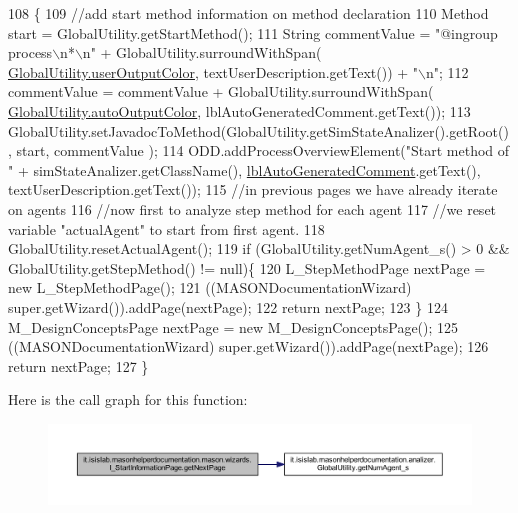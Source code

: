 \begin{DoxyCode}
108                                     \{ 
109         \textcolor{comment}{//add start method information on method declaration}
110         Method start = GlobalUtility.getStartMethod();
111         String commentValue = \textcolor{stringliteral}{"@ingroup process\(\backslash\)n*\(\backslash\)n"} + GlobalUtility.surroundWithSpan(
      \hyperlink{classit_1_1isislab_1_1masonhelperdocumentation_1_1analizer_1_1_global_utility_aec864cd710b27ece609c5a6093211ff4}{GlobalUtility.userOutputColor}, textUserDescription.getText()) + \textcolor{stringliteral}{"\(\backslash\)n"};
112         commentValue = commentValue + GlobalUtility.surroundWithSpan(
      \hyperlink{classit_1_1isislab_1_1masonhelperdocumentation_1_1analizer_1_1_global_utility_a42aa676ad1ff27c42cd4aab651ff2a35}{GlobalUtility.autoOutputColor}, lblAutoGeneratedComment.getText());
113         GlobalUtility.setJavadocToMethod(GlobalUtility.getSimStateAnalizer().getRoot(), start, commentValue
      );
114         ODD.addProcessOverviewElement(\textcolor{stringliteral}{"Start method of "} + simStateAnalizer.getClassName(), 
      \hyperlink{classit_1_1isislab_1_1masonhelperdocumentation_1_1mason_1_1wizards_1_1_i___start_information_page_a71b48bb46faed54b4236b3d52a074580}{lblAutoGeneratedComment}.getText(), textUserDescription.getText());
115         \textcolor{comment}{//in previous pages we have already iterate on agents}
116         \textcolor{comment}{//now first to analyze step method for each agent}
117         \textcolor{comment}{//we reset variable "actualAgent" to start from first agent.}
118         GlobalUtility.resetActualAgent();
119         \textcolor{keywordflow}{if} (GlobalUtility.getNumAgent\_s() > 0 && GlobalUtility.getStepMethod() != null)\{
120             L\_StepMethodPage nextPage = \textcolor{keyword}{new} L\_StepMethodPage();
121             ((MASONDocumentationWizard) super.getWizard()).addPage(nextPage);
122             \textcolor{keywordflow}{return} nextPage;
123         \}
124         M\_DesignConceptsPage nextPage = \textcolor{keyword}{new} M\_DesignConceptsPage();
125         ((MASONDocumentationWizard) super.getWizard()).addPage(nextPage);
126         \textcolor{keywordflow}{return} nextPage;
127     \}
\end{DoxyCode}


Here is the call graph for this function\-:\nopagebreak
\begin{figure}[H]
\begin{center}
\leavevmode
\includegraphics[width=350pt]{classit_1_1isislab_1_1masonhelperdocumentation_1_1mason_1_1wizards_1_1_i___start_information_page_af04d37e7abfe04292439e4df5d63ceb8_cgraph}
\end{center}
\end{figure}


